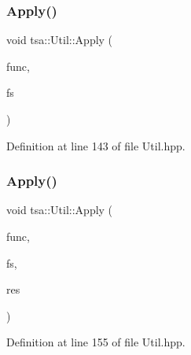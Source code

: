 \subsubsection{\texorpdfstring{Apply()}{Apply()}\hspace{0.1cm}{\footnotesize\ttfamily [3/4]}}
{\footnotesize\ttfamily void tsa\+::\+Util\+::\+Apply (\begin{DoxyParamCaption}\item[{std\+::complex$<$ double $>$($\ast$)(std\+::complex$<$ double $>$)}]{func,  }\item[{\hyperlink{namespacetsa_ab32775c889b53c40fa83939f22372b75}{Seq\+View\+Complex} \&}]{fs }\end{DoxyParamCaption})\hspace{0.3cm}{\ttfamily [inline]}}



Definition at line 143 of file Util.\+hpp.

\mbox{\label{classtsa_1_1_util_af2b974e7bd7581f138b00db9640b3813}} 
\subsubsection{\texorpdfstring{Apply()}{Apply()}\hspace{0.1cm}{\footnotesize\ttfamily [4/4]}}
{\footnotesize\ttfamily void tsa\+::\+Util\+::\+Apply (\begin{DoxyParamCaption}\item[{std\+::complex$<$ double $>$($\ast$)(std\+::complex$<$ double $>$)}]{func,  }\item[{\hyperlink{namespacetsa_ab32775c889b53c40fa83939f22372b75}{Seq\+View\+Complex} \&}]{fs,  }\item[{\hyperlink{namespacetsa_ab32775c889b53c40fa83939f22372b75}{Seq\+View\+Complex} \&}]{res }\end{DoxyParamCaption})\hspace{0.3cm}{\ttfamily [inline]}}



Definition at line 155 of file Util.\+hpp.

\mbox{\label{classtsa_1_1_util_afbd158ce20afc089209fb7322ef13777}} 
